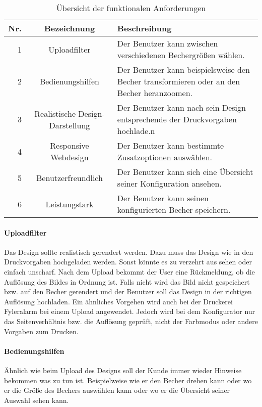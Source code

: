 \renewcommand{\arraystretch}{1.8}
\begin{table}
	\begin{tabular}{|r|c|p{8.5cm}|}
		\hline
		\textbf{Nr.} & \textbf{Bezeichnung} & \textbf{Beschreibung} \\
		\hline
		1 & Uploadfilter & Der Benutzer kann zwischen verschiedenen Bechergrößen wählen. \\
		\hline
		2 & Bedienungshilfen & Der Benutzer kann beispielsweise den Becher transformieren oder an den Becher heranzoomen. \\
		\hline
		3 & Realistische Design-Darstellung & Der Benutzer kann nach sein Design entsprechende der Druckvorgaben hochlade.n \\
		\hline
		4 & Responsive Webdesign & Der Benutzer kann bestimmte Zusatzoptionen auswählen. \\
		\hline
		5 & Benutzerfreundlich & Der Benutzer kann sich eine Übersicht seiner Konfiguration ansehen. \\
		\hline
		6 & Leistungstark & Der Benutzer kann seinen konfigurierten Becher speichern. \\
		\hline
	\end{tabular}
	\caption{Übersicht der funktionalen Anforderungen}
\end{table}
%
\paragraph{Uploadfilter}
Das Design sollte realistisch gerendert werden. Dazu muss das Design wie in den Druckvorgaben hochgeladen werden. Sonst könnte es zu verzehrt aus sehen oder einfach unscharf. Nach dem Upload bekommt der User eine Rückmeldung, ob die Auflösung des Bildes in Ordnung ist. Falls nicht wird das Bild nicht gespeichert bzw. auf den Becher gerendert und der Benutzer soll das Design in der richtigen Auflösung hochladen. Ein ähnliches Vorgehen wird auch bei der Druckerei Fyleralarm bei einem Upload angewendet. Jedoch wird bei dem Konfigurator nur das Seitenverhältnis bzw. die Auflösung geprüft, nicht der Farbmodus oder andere Vorgaben zum Drucken.
%
\paragraph{Bedienungshilfen}
Ähnlich wie beim Upload des Designs soll der Kunde immer wieder Hinweise bekommen was zu tun ist. Beispielweise wie er den Becher drehen kann oder wo er die Größe des Bechers auswählen kann oder wo er die Übersicht seiner Auswahl sehen kann.
%
